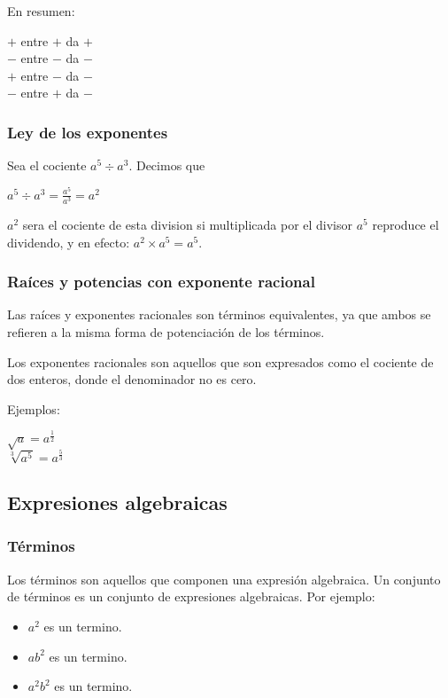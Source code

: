 En resumen:
\begin{center}
	$+$ entre $+$ da $+$\\
	$-$ entre $-$ da $-$\\
	$+$ entre $-$ da $-$\\
	$-$ entre $+$ da $-$\\
\end{center}

\subsubsection{Ley de los exponentes}
Sea el cociente $a^5 \div a^3$. Decimos que
\begin{center}
	$a^5 \div a^3 = \frac{a^5}{a^3} = a^2$\\
\end{center}
$a^2$ sera el cociente de esta division si multiplicada por el divisor $a^5$ reproduce el dividendo, y en efecto: $a^2 \times a^5 = a^5$.
\subsubsection{Raíces y potencias con exponente racional}

Las raíces y exponentes racionales son términos equivalentes, ya que ambos se refieren a la misma forma de potenciación de los términos.

Los exponentes racionales son aquellos que son expresados como el cociente de dos enteros, donde el denominador no es cero.

Ejemplos:

\begin{center}
$\sqrt{a} = a^{\frac{1}{2}}$\\
$\sqrt[3]{a^5} = a^{\frac{5}{3}}$
\end{center}


\subsection{Expresiones algebraicas}

\subsubsection{Términos}

Los términos son aquellos que componen una expresión algebraica. Un conjunto de términos es un conjunto de expresiones algebraicas. Por ejemplo:

\begin{itemize}
	\item $a^2$ es un termino.
	\item $ab^2$ es un termino.
	\item $a^2b^2$ es un termino.
\end{itemize}

